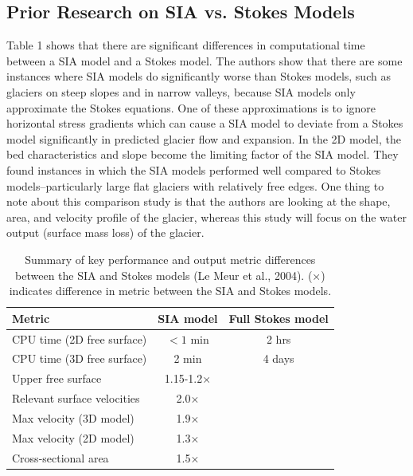 \documentclass{article}
\begin{document}
\subsection{Prior Research on SIA vs. Stokes Models}
Table 1 shows that there are significant differences in computational time between a SIA model and a Stokes model. 
The authors show that there are some instances where SIA models do significantly worse than 
Stokes models, such as glaciers on steep slopes and in narrow valleys, because SIA models only approximate the Stokes 
equations. One of these approximations is to ignore horizontal stress gradients which can cause a SIA model to deviate from a Stokes model 
significantly in predicted glacier flow and expansion. In the 2D model, the bed characteristics and slope become the limiting factor of the SIA model.
They found instances in which the SIA models performed well 
compared to Stokes models--particularly large flat glaciers with relatively free edges. One thing to note about this comparison study is 
that the authors are looking at the shape, area, and velocity profile of the glacier, whereas this study will focus on the water output 
(surface mass loss) of the glacier.
\begin{table}[ht]
    \centering
    \begin{tabular}{lcc}
      \hline
      \textbf{Metric} & \textbf{SIA model} & \textbf{Full Stokes model} \\
      \hline
      CPU time (2D free surface)                & $<1$ min        & 2 hrs    \\
      CPU time (3D free surface)                & 2 min  & 4 days    \\
      Upper free surface        & 1.15-1.2×    &    \\
      Relevant surface velocities    & 2.0×   &      \\
      Max velocity (3D model)               & 1.9×         &       \\
      Max velocity (2D model)               & 1.3×         &        \\
      Cross-sectional area        & 1.5×         &       \\
      \hline
    \end{tabular}
    \caption{Summary of key performance and output metric differences between the SIA and Stokes models (Le Meur et al., 2004). (×) indicates difference in metric between the SIA and Stokes models.}
    \label{tab:sia_vs_stokes}
  \end{table}
\FloatBarrier  
  
\end{document}
